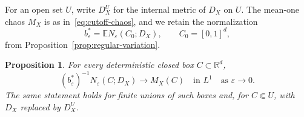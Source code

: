 \documentclass[11pt,letterpaper]{article}
\newcommand{\R}{\mathbb R}
\newcommand{\E}{\mathbb E}
\newcommand{\eps}{\varepsilon}
\newtheorem{proposition}[theorem]{Proposition}
\theoremstyle{definition}
\theoremstyle{remark}
\numberwithin{equation}{section}
\begin{document}
For an open set $U$, write $D_X^U$ for the internal metric of $D_X$ on $U$. The mean-one chaos $M_X$ is as in~\eqref{eq:cutoff-chaos}, and we retain the normalization
\begin{equation*}
 b_\eps^*=\E N_\eps(C_0;D_X),\qquad C_0=[0,1]^d,
\end{equation*}
from Proposition~\ref{prop:regular-variation}.

\begin{proposition}\label{prop:cutoff-convergence}
For every deterministic closed box $C\subset\R^d$,
\begin{equation*}
 (b_\eps^*)^{-1}N_\eps(C;D_X)\longrightarrow M_X(C)
 \quad\text{in }L^1\quad\text{as }\eps\to0.
\end{equation*}
The same statement holds for finite unions of such boxes and, for $C\Subset U$, with $D_X$ replaced by $D_X^U$.
\end{proposition}
\end{document}
